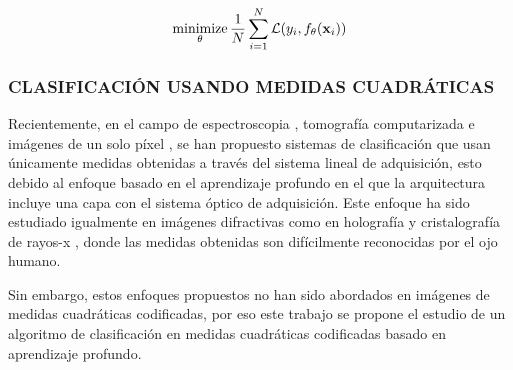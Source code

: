 \begin{equation}
    \operatorname*{minimize}_\theta \frac{1}{N}\sum_{i=1}^{N} \mathcal{L}( y_i,  f_\theta(\mathbf{x}_i))
    \label{eq:optimización_nn}
\end{equation}

\subsubsection{CLASIFICACIÓN USANDO MEDIDAS CUADRÁTICAS}
Recientemente, en el campo de espectroscopia \cite{bacca2021deep}, tomografía computarizada \cite{douarre2020value} e imágenes de un solo píxel \cite{bacca2020coupled}, se han propuesto sistemas de clasificación que usan únicamente medidas obtenidas a través del sistema lineal de adquisición, esto debido al enfoque basado en el aprendizaje profundo en el que la arquitectura incluye una capa con el sistema óptico de adquisición. Este enfoque ha sido estudiado igualmente en imágenes difractivas como en holografía \cite{kim2018deep} y cristalografía de rayos-x \cite{ziletti2018insightful}, donde las medidas obtenidas son difícilmente reconocidas por el ojo humano. 

Sin embargo, estos enfoques propuestos no han sido abordados en imágenes de medidas cuadráticas codificadas, por eso este trabajo se propone el estudio de un algoritmo de clasificación en medidas cuadráticas codificadas basado en aprendizaje profundo.
\pagebreak